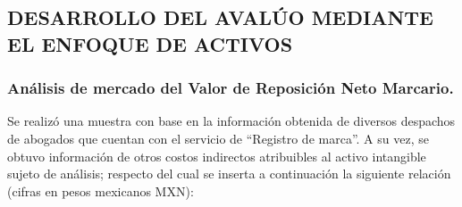 \subsection{DESARROLLO DEL AVALÚO MEDIANTE EL ENFOQUE DE ACTIVOS}

\subsubsection{Análisis de mercado del Valor de Reposición Neto Marcario.}

Se realizó una muestra con base en la información obtenida de diversos despachos de abogados que cuentan con el servicio de ``Registro de marca''. A su vez, se obtuvo información de otros costos indirectos atribuibles al activo intangible sujeto de análisis; respecto del cual se inserta a continuación la siguiente relación (cifras en pesos mexicanos MXN):

